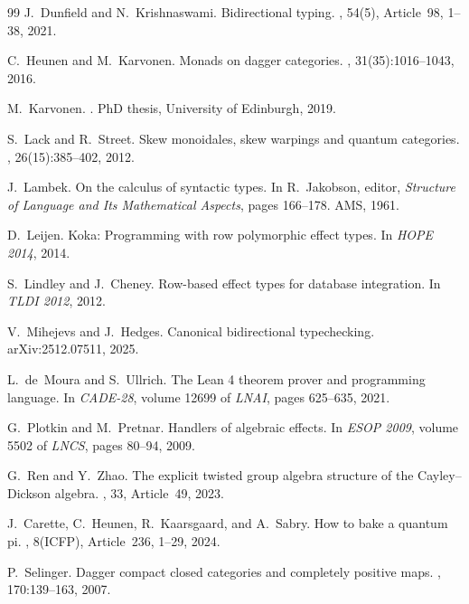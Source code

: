 \documentclass[11pt,a4paper]{article}
\theoremstyle{definition}
\theoremstyle{remark}
\begin{document}
\begin{thebibliography}{99}
J.~Dunfield and N.~Krishnaswami.
\newblock Bidirectional typing.
, 54(5), Article~98, 1--38, 2021.

C.~Heunen and M.~Karvonen.
\newblock Monads on dagger categories.
, 31(35):1016--1043, 2016.

M.~Karvonen.
.
\newblock PhD thesis, University of Edinburgh, 2019.

S.~Lack and R.~Street.
\newblock Skew monoidales, skew warpings and quantum categories.
, 26(15):385--402, 2012.

J.~Lambek.
\newblock On the calculus of syntactic types.
\newblock In R.~Jakobson, editor, {\em Structure of Language and Its
  Mathematical Aspects}, pages 166--178. AMS, 1961.

D.~Leijen.
\newblock Koka: Programming with row polymorphic effect types.
\newblock In {\em HOPE 2014}, 2014.

S.~Lindley and J.~Cheney.
\newblock Row-based effect types for database integration.
\newblock In {\em TLDI 2012}, 2012.

V.~Mihejevs and J.~Hedges.
\newblock Canonical bidirectional typechecking.
\newblock arXiv:2512.07511, 2025.

L.~de~Moura and S.~Ullrich.
\newblock The {L}ean 4 theorem prover and programming language.
\newblock In {\em CADE-28}, volume 12699 of {\em LNAI}, pages 625--635, 2021.

G.~Plotkin and M.~Pretnar.
\newblock Handlers of algebraic effects.
\newblock In {\em ESOP 2009}, volume 5502 of {\em LNCS}, pages 80--94, 2009.

G.~Ren and Y.~Zhao.
\newblock The explicit twisted group algebra structure of the {C}ayley--{D}ickson algebra.
, 33, Article~49, 2023.

J.~Carette, C.~Heunen, R.~Kaarsgaard, and A.~Sabry.
\newblock How to bake a quantum pi.
, 8(ICFP), Article~236, 1--29, 2024.

P.~Selinger.
\newblock Dagger compact closed categories and completely positive maps.
, 170:139--163, 2007.


\end{thebibliography}
\end{document}
